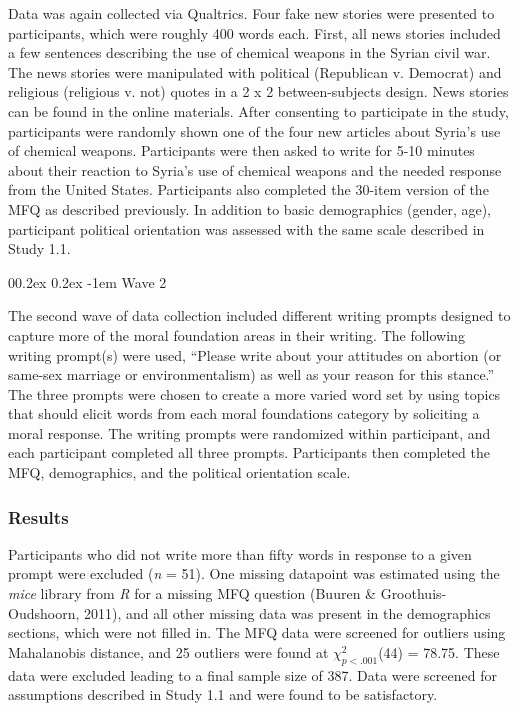 \documentclass[
  man,floatsintext]{apa6}
\makeatletter
\let\oldparagraph\paragraph
\renewcommand{\paragraph}{
    \@ifstar
      \xxxParagraphStar
      \xxxParagraphNoStar
  }
\newcommand{\xxxParagraphStar}[1]{\oldparagraph*{#1}\mbox{}}
\newcommand{\xxxParagraphNoStar}[1]{\oldparagraph{#1}\mbox{}}
\renewcommand{\paragraph}{\@startsection{paragraph}{4}{\parindent}%
  {0\baselineskip \@plus 0.2ex \@minus 0.2ex}%
  {-1em}%
  {\normalfont\normalsize\bfseries\itshape\typesectitle}}
\makeatother
\begin{document}
Data was again collected via Qualtrics. Four fake new stories
were presented to participants, which were roughly 400 words each.
First, all news stories included a few sentences describing the use of
chemical weapons in the Syrian civil war. The news stories were
manipulated with political (Republican v. Democrat) and religious
(religious v. not) quotes in a 2 x 2 between-subjects design. News
stories can be found in the online materials. After consenting to
participate in the study, participants were randomly shown one of the
four new articles about Syria's use of chemical weapons. Participants
were then asked to write for 5-10 minutes about their reaction to
Syria's use of chemical weapons and the needed response from the United
States. Participants also completed the 30-item version of the MFQ as
described previously. In addition to basic demographics (gender, age),
participant political orientation was assessed with the same scale
described in Study 1.1.

\paragraph{Wave 2}\label{wave-2}

The second wave of data collection included different writing prompts
designed to capture more of the moral foundation areas in their writing.
The following writing prompt(s) were used, ``Please write about your
attitudes on abortion (or same-sex marriage or environmentalism) as well
as your reason for this stance.'' The three prompts were chosen to create
a more varied word set by using topics that should elicit words from
each moral foundations category by soliciting a moral response. The
writing prompts were randomized within participant, and each participant
completed all three prompts. Participants then completed the MFQ,
demographics, and the political orientation scale.

\subsubsection{Results}\label{results-1}

Participants who did not write more than fifty words in
response to a given prompt were excluded (\emph{n} =
51). One missing datapoint was
estimated using the \emph{mice} library from \emph{R} for a missing MFQ question
(Buuren \& Groothuis-Oudshoorn, 2011), and all other missing data was present in the
demographics sections, which were not filled in. The MFQ data were
screened for outliers using Mahalanobis distance, and 25 outliers were
found at \(\chi^2_{p<.001}\)(44) =
78.75. These data were excluded leading to a final
sample size of 387. Data were screened for assumptions
described in Study 1.1 and were found to be satisfactory.
\end{document}

